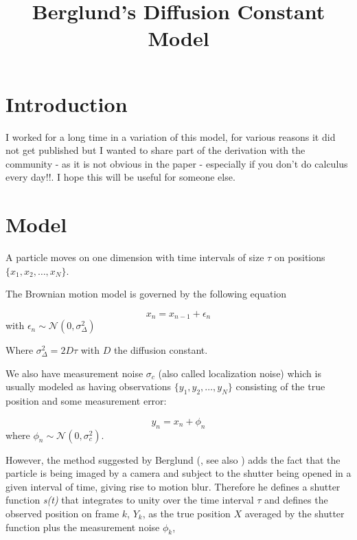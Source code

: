 \documentclass[ba]{imsart}\usepackage[]{graphicx}\usepackage[]{xcolor}
\numberwithin{equation}{section}
\theoremstyle{plain}
\begin{document}
\begin{frontmatter}
\title{Berglund's Diffusion Constant Model}

\begin{aug}
\author{ }
\runauthor{}
\end{aug}

\end{frontmatter}





\section{Introduction}

I worked for a long time in a variation of this model, for various reasons it did not get published but I wanted to share part of the derivation with the community - as it is not obvious in the paper - especially if you don't do calculus every day!!. I hope this will be useful for someone else.

\section{Model}


A particle moves on one dimension with time intervals of size $\tau$ on positions
$\{x_1, x_2,\dotsc,x_N\}$.

The Brownian motion model is governed by the following equation

$$
  x_n = x_{n-1}+\epsilon_n
$$
  with $\epsilon_n \sim \mathcal{N}(0,\sigma^2_\Delta)$

  Where $\sigma^2_\Delta = 2D\tau$ with $D$ the diffusion constant.

We also have measurement noise $\sigma_c$ (also called localization noise) which is usually modeled as having observations
$\{y_1, y_2,\dotsc,y_N\}$ consisting of the true position and some measurement error:

  $$
  y_n = x_n + \phi_n
$$
  where $\phi_n \sim \mathcal{N}(0,\sigma_c^2)$.

However, the method suggested by Berglund (\cite{RN44}, see also \cite{BerglundMichalet2012}) adds the fact that the particle is being imaged by a camera and subject to the shutter being opened in a given interval of time, giving rise to motion blur. Therefore he defines a shutter function \emph{s(t)} that integrates to unity over the time interval $\tau$ and defines the observed position on frame $k$, $Y_k$, as the true position $X$ averaged by the shutter function plus the measurement noise $\phi_k$,
\end{document}
